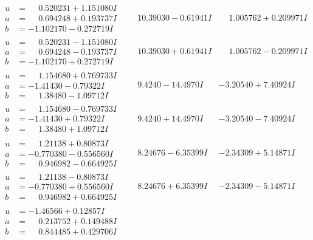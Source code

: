 \documentclass[1p]{elsarticle_modified}
\theoremstyle{definition}
\begin{document}
$$\begin{array}{c|c|c}
\begin{aligned}
u &= \phantom{-}0.520231 + 1.151080 I \\
a &= \phantom{-}0.694248 + 0.193737 I \\
b &= -1.102170 - 0.272719 I\end{aligned}
 & \phantom{-}10.39030 - 0.61941 I & \phantom{-}1.005762 + 0.209971 I \\ \hline\begin{aligned}
u &= \phantom{-}0.520231 - 1.151080 I \\
a &= \phantom{-}0.694248 - 0.193737 I \\
b &= -1.102170 + 0.272719 I\end{aligned}
 & \phantom{-}10.39030 + 0.61941 I & \phantom{-}1.005762 - 0.209971 I \\ \hline\begin{aligned}
u &= \phantom{-}1.154680 + 0.769733 I \\
a &= -1.41430 - 0.79322 I \\
b &= \phantom{-}1.38480 - 1.09712 I\end{aligned}
 & \phantom{-}9.4240 - 14.4970 I & -3.20540 + 7.40924 I \\ \hline\begin{aligned}
u &= \phantom{-}1.154680 - 0.769733 I \\
a &= -1.41430 + 0.79322 I \\
b &= \phantom{-}1.38480 + 1.09712 I\end{aligned}
 & \phantom{-}9.4240 + 14.4970 I & -3.20540 - 7.40924 I \\ \hline\begin{aligned}
u &= \phantom{-}1.21138 + 0.80873 I \\
a &= -0.770380 - 0.556560 I \\
b &= \phantom{-}0.946982 - 0.664925 I\end{aligned}
 & \phantom{-}8.24676 - 6.35399 I & -2.34309 + 5.14871 I \\ \hline\begin{aligned}
u &= \phantom{-}1.21138 - 0.80873 I \\
a &= -0.770380 + 0.556560 I \\
b &= \phantom{-}0.946982 + 0.664925 I\end{aligned}
 & \phantom{-}8.24676 + 6.35399 I & -2.34309 - 5.14871 I \\ \hline\begin{aligned}
u &= -1.46566 + 0.12857 I \\
a &= \phantom{-}0.213752 + 0.149488 I \\
b &= \phantom{-}0.844485 + 0.429706 I\end{aligned}

\end{array}$$
\end{document}
